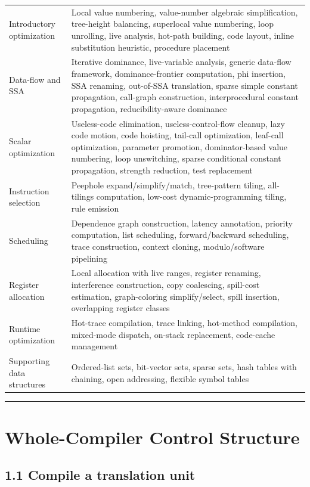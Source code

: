\documentclass[10pt,letterpaper]{article}
\begin{document}
\begin{longtable}{L{0.27\textwidth}L{0.66\textwidth}}
Introductory optimization & Local value numbering, value-number algebraic simplification, tree-height balancing, superlocal value numbering, loop unrolling, live analysis, hot-path building, code layout, inline substitution heuristic, procedure placement \\
Data-flow and SSA & Iterative dominance, live-variable analysis, generic data-flow framework, dominance-frontier computation, phi insertion, SSA renaming, out-of-SSA translation, sparse simple constant propagation, call-graph construction, interprocedural constant propagation, reducibility-aware dominance \\
Scalar optimization & Useless-code elimination, useless-control-flow cleanup, lazy code motion, code hoisting, tail-call optimization, leaf-call optimization, parameter promotion, dominator-based value numbering, loop unswitching, sparse conditional constant propagation, strength reduction, test replacement \\
Instruction selection & Peephole expand/simplify/match, tree-pattern tiling, all-tilings computation, low-cost dynamic-programming tiling, rule emission \\
Scheduling & Dependence graph construction, latency annotation, priority computation, list scheduling, forward/backward scheduling, trace construction, context cloning, modulo/software pipelining \\
Register allocation & Local allocation with live ranges, register renaming, interference construction, copy coalescing, spill-cost estimation, graph-coloring simplify/select, spill insertion, overlapping register classes \\
Runtime optimization & Hot-trace compilation, trace linking, hot-method compilation, mixed-mode dispatch, on-stack replacement, code-cache management \\
Supporting data structures & Ordered-list sets, bit-vector sets, sparse sets, hash tables with chaining, open addressing, flexible symbol tables \\
\bottomrule
\end{longtable}

\medskip\hrule\medskip

\clearpage
\section{Whole-Compiler Control Structure}

\subsection*{1.1 Compile a translation unit}
\end{document}
